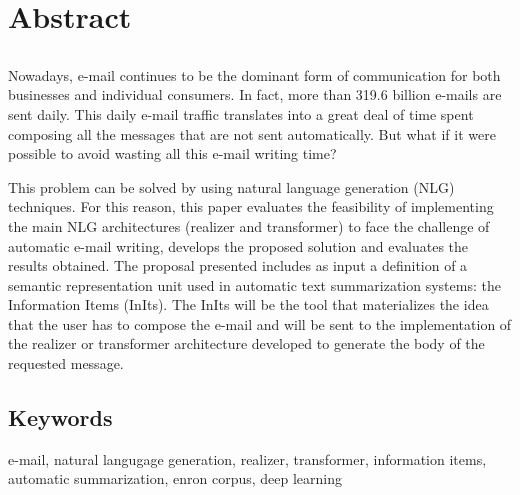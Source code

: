 \chapter*{Abstract}

\section*{\tituloPortadaEngVal}

Nowadays, e-mail continues to be the dominant form of communication for both businesses and individual consumers. In fact, more than 319.6 billion e-mails are sent daily. This daily e-mail traffic translates into a great deal of time spent composing all the messages that are not sent automatically. But what if it were possible to avoid wasting all this e-mail writing time?

This problem can be solved by using natural language generation (NLG) techniques. For this reason, this paper evaluates the feasibility of implementing the main NLG architectures (realizer and transformer) to face the challenge of automatic e-mail writing, develops the proposed solution and evaluates the results obtained. The proposal presented includes as input a definition of a semantic representation unit used in automatic text summarization systems: the Information Items (InIts). The InIts will be the tool that materializes the idea that the user has to compose the e-mail and will be sent to the implementation of the realizer or transformer architecture developed to generate the body of the requested message.


\section*{Keywords}

\noindent e-mail, natural langugage generation, realizer, transformer, information items, automatic summarization, enron corpus, deep learning



